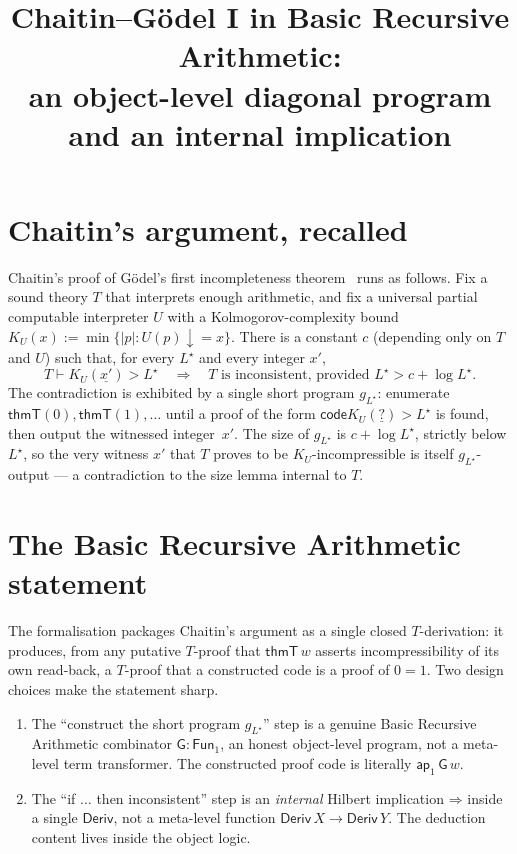 \documentclass[11pt]{article}
\title{Chaitin--G\"odel I in Basic Recursive Arithmetic:\\
  an object-level diagonal program and an internal implication}
\author{}
\date{}
\newcommand{\Deriv}{\mathsf{Deriv}}
\newcommand{\thmT}{\mathsf{thmT}}
\newcommand{\codeF}{\mathsf{code}}
\newcommand{\ap}[1]{\mathsf{ap}_{#1}}
\newcommand{\Fun}[1]{\mathsf{Fun}_{#1}}
\newcommand{\imp}{\mathbin{\Rightarrow}}
\newcommand{\GG}{\mathsf{G}}
\newcommand{\Lstar}{L^{\!\star}}
\begin{document}
\maketitle

\section{Chaitin's argument, recalled}

Chaitin's proof of G\"odel's first incompleteness theorem~\cite{Chaitin1971,Chaitin1974}
runs as follows. Fix a sound theory $T$ that interprets enough arithmetic, and fix a
universal partial computable interpreter $U$ with a Kolmogorov-complexity bound
$K_U(x) := \min\{|p| : U(p)\downarrow = x\}$. There is a constant $c$
(depending only on $T$ and $U$) such that, for every $\Lstar$ and every
integer $x'$,
\[
  T \vdash K_U(\underline{x'}) > \Lstar
  \quad\Longrightarrow\quad
  \text{$T$ is inconsistent, provided } \Lstar > c + \log \Lstar.
\]
The contradiction is exhibited by a single short program $g_{\Lstar}$:
enumerate $\thmT(0), \thmT(1), \dots$ until a proof of the form
$\codeF{K_U(\underline{?}) > \Lstar}$ is found, then output the
witnessed integer~$x'$. The size of $g_{\Lstar}$ is $c + \log \Lstar$,
strictly below $\Lstar$, so the very witness $x'$ that $T$ proves to be
$K_U$-incompressible is itself $g_{\Lstar}$-output --- a contradiction
to the size lemma internal to $T$.

\section{The Basic Recursive Arithmetic statement}

The formalisation packages Chaitin's argument as a single closed
$T$-derivation: it produces, from any putative $T$-proof that
$\thmT\,w$ asserts incompressibility of its own read-back, a $T$-proof
that a constructed code is a proof of $0=1$. Two design choices make
the statement sharp.

\begin{enumerate}
\item The ``construct the short program $g_{\Lstar}$'' step is a
  genuine Basic Recursive Arithmetic combinator $\GG : \Fun{1}$, an honest object-level
  program, not a meta-level term transformer. The constructed proof
  code is literally $\ap{1}\,\GG\,w$.
\item The ``if $\dots$ then inconsistent'' step is an
  \emph{internal} Hilbert implication $\imp$ inside a single $\Deriv$,
  not a meta-level function $\Deriv\,X \to \Deriv\,Y$. The deduction
  content lives inside the object logic.
\end{enumerate}
\end{document}
